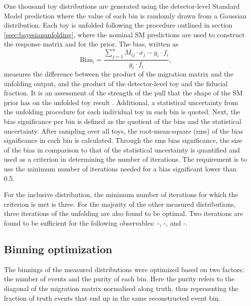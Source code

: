 One thousand toy distributions are generated using the detector-level Standard Model prediction where the value of each bin is randomly drawn from a Gaussian distribution. Each toy is unfolded following the procedure outlined in section \ref{ssec:bayesianunfolding}, where the nominal SM predictions are used to construct the response matrix and for the prior. The bias, written as
\begin{equation} \label{eq:unfbias}
    \text{Bias}_i=\dfrac{\sum_{j=1}^nM_{ij}\cdot x_j-y_i\cdot f_i}{y_i\cdot f_i},
\end{equation}
measures the difference between the product of the migration matrix and the unfolding output, and the product of the detector-level toy and the fiducial fraction. It is an assessment of the strength of the pull that the shape of the SM prior has on the unfolded toy result . Additional, a statistical uncertainty from the unfolding procedure for each individual toy in each bin is quoted. Next, the bias significance per bin is defined as the quotient of the bias and the statistical uncertainty. After sampling over all toys, the root-mean-square (rms) of the bias significance in each bin is calculated. Through the rms bias significance, the size of the bias in comparison to that of the statistical uncertainty is quantified and used as a criterion in determining the number of iterations. The requirement is to use the minimum number of iterations needed for a bias significant lower than 0.5.

For the inclusive \mFourL{} distribution, the minimum number of iterations for which the criterion is met is three. For the majority of the other measured distributions, three iterations of the unfolding are also found to be optimal. Two iterations are found to be sufficient for the following observables: \mZOne-\mFourL, \dPhill-\mFourL, and \dYPairs-\mFourL.

\subsection{Binning optimization}
\label{subsec:binningopt}

The binnings of the measured distributions were optimized based on two factors: the number of events and the purity of each bin. Here the purity refers to the diagonal of the migration matrix normalised along truth, thus representing the fraction of truth events that end up in the same reconstructed event bin. 


